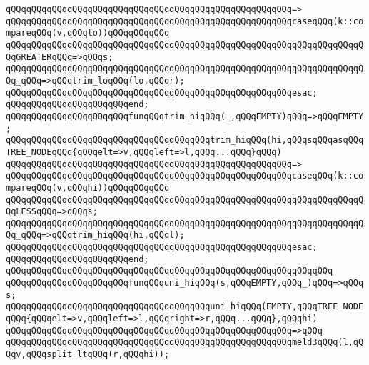 \verb|qQQqqQQqqQQqqQQqqQQqqQQqqQQqqQQqqQQqqQQqqQQqqQQqqQQqqQQq=>|\newline
\verb|qQQqqQQqqQQqqQQqqQQqqQQqqQQqqQQqqQQqqQQqqQQqqQQqqQQqqQQqcaseqQQq(k::compareqQQq(v,qQQqlo))qQQqqQQqqQQq|\newline
\verb|qQQqqQQqqQQqqQQqqQQqqQQqqQQqqQQqqQQqqQQqqQQqqQQqqQQqqQQqqQQqqQQqqQQqqQQqGREATERqQQq=>qQQqs;|\newline
\verb|qQQqqQQqqQQqqQQqqQQqqQQqqQQqqQQqqQQqqQQqqQQqqQQqqQQqqQQqqQQqqQQqqQQqqQQq_qQQq=>qQQqtrim_loqQQq(lo,qQQqr);|\newline
\verb|qQQqqQQqqQQqqQQqqQQqqQQqqQQqqQQqqQQqqQQqqQQqqQQqqQQqqQQqesac;|\newline
\verb|qQQqqQQqqQQqqQQqqQQqqQQqend;|\newline
\newline
\verb|qQQqqQQqqQQqqQQqqQQqqQQqfunqQQqtrim_hiqQQq(_,qQQqEMPTY)qQQq=>qQQqEMPTY;|\newline
\newline
\verb|qQQqqQQqqQQqqQQqqQQqqQQqqQQqqQQqqQQqqQQqtrim_hiqQQq(hi,qQQqsqQQqasqQQqTREE_NODEqQQq{qQQqelt=>v,qQQqleft=>l,qQQq...qQQq}qQQq)|\newline
\verb|qQQqqQQqqQQqqQQqqQQqqQQqqQQqqQQqqQQqqQQqqQQqqQQqqQQqqQQq=>|\newline
\verb|qQQqqQQqqQQqqQQqqQQqqQQqqQQqqQQqqQQqqQQqqQQqqQQqqQQqqQQqcaseqQQq(k::compareqQQq(v,qQQqhi))qQQqqQQqqQQq|\newline
\verb|qQQqqQQqqQQqqQQqqQQqqQQqqQQqqQQqqQQqqQQqqQQqqQQqqQQqqQQqqQQqqQQqqQQqqQQqLESSqQQq=>qQQqs;|\newline
\verb|qQQqqQQqqQQqqQQqqQQqqQQqqQQqqQQqqQQqqQQqqQQqqQQqqQQqqQQqqQQqqQQqqQQqqQQq_qQQq=>qQQqtrim_hiqQQq(hi,qQQql);|\newline
\verb|qQQqqQQqqQQqqQQqqQQqqQQqqQQqqQQqqQQqqQQqqQQqqQQqqQQqqQQqesac;|\newline
\verb|qQQqqQQqqQQqqQQqqQQqqQQqend;|\newline
\verb|qQQqqQQqqQQqqQQqqQQqqQQqqQQqqQQqqQQqqQQqqQQqqQQqqQQqqQQqqQQqqQQq|\newline
\verb|qQQqqQQqqQQqqQQqqQQqqQQqfunqQQquni_hiqQQq(s,qQQqEMPTY,qQQq_)qQQq=>qQQqs;|\newline
\newline
\verb|qQQqqQQqqQQqqQQqqQQqqQQqqQQqqQQqqQQqqQQquni_hiqQQq(EMPTY,qQQqTREE_NODEqQQq{qQQqelt=>v,qQQqleft=>l,qQQqright=>r,qQQq...qQQq},qQQqhi)|\newline
\verb|qQQqqQQqqQQqqQQqqQQqqQQqqQQqqQQqqQQqqQQqqQQqqQQqqQQqqQQq=>qQQq|\newline
\verb|qQQqqQQqqQQqqQQqqQQqqQQqqQQqqQQqqQQqqQQqqQQqqQQqqQQqqQQqmeld3qQQq(l,qQQqv,qQQqsplit_ltqQQq(r,qQQqhi));|\newline
